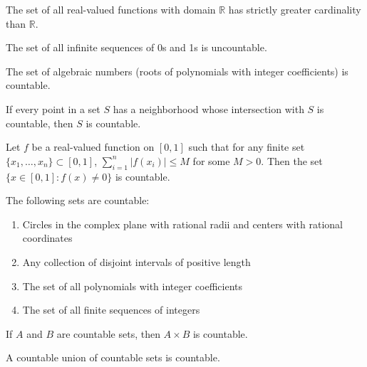 \begin{theorem}
The set of all real-valued functions with domain $\mathbb{R}$ has strictly greater cardinality than $\mathbb{R}$.
\end{theorem}

\begin{theorem}
The set of all infinite sequences of 0s and 1s is uncountable.
\end{theorem}

\begin{theorem}
The set of algebraic numbers (roots of polynomials with integer coefficients) is countable.
\end{theorem}

\begin{theorem}
If every point in a set $S$ has a neighborhood whose intersection with $S$ is countable, then $S$ is countable.
\end{theorem}

\begin{theorem}
Let $f$ be a real-valued function on $[0,1]$ such that for any finite set $\{x_1, \ldots, x_n\} \subset [0,1]$, $\sum_{i=1}^n |f(x_i)| \leq M$ for some $M > 0$. Then the set $\{x \in [0,1] : f(x) \neq 0\}$ is countable.
\end{theorem}

\begin{theorem}
The following sets are countable:
\begin{enumerate}
\item Circles in the complex plane with rational radii and centers with rational coordinates
\item Any collection of disjoint intervals of positive length
\item The set of all polynomials with integer coefficients
\item The set of all finite sequences of integers
\end{enumerate}
\end{theorem}

\begin{theorem}
If $A$ and $B$ are countable sets, then $A \times B$ is countable.
\end{theorem}

\begin{theorem}
A countable union of countable sets is countable.
\end{theorem}

